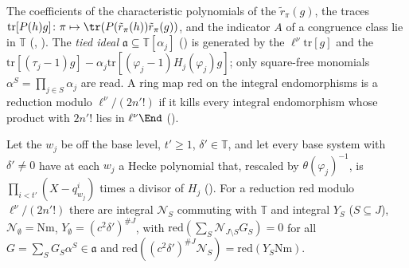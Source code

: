 The coefficients of the characteristic polynomials of the $\tilde r_\pi(g)$, the traces
$\mathrm{tr}[P(h)g]\colon\pi\mapsto\tr(P(\tilde r_\pi(h))\tilde r_\pi(g))$, and the indicator $A$ of a congruence class lie in
$\mathbb T$ (,
). The \emph{tied ideal}
$\mathfrak a\subseteq\mathbb T[\alpha_j]$ () is generated by the
$\ell^\nu\mathrm{tr}[g]$ and the $\mathrm{tr}[(\tau_j-1)g]-\alpha_j\mathrm{tr}[(\varphi_j-1)H_j(\varphi_j)g]$;
only square-free monomials $\alpha^S=\prod_{j\in S}\alpha_j$ are read. A ring map $\mathrm{red}$ on the integral
endomorphisms is a reduction modulo $\ell^\nu/(2n'!)$ if it kills every integral endomorphism whose
product with $2n'!$ lies in $\ell^\nu\End$ ().

\begin{theorem}\label{cg-first:thm:tie}
Let the $w_j$ be off the base level, $t'\ge1$, $\delta'\in\mathbb T$, and let every base system with
$\delta'\neq0$ have at each $w_j$ a Hecke polynomial that, rescaled by $\theta(\varphi_j)^{-1}$, is
$\prod_{i<t'}(X-q_{w_j}^i)$ times a divisor of $H_j$ (). For a reduction
$\mathrm{red}$ modulo $\ell^\nu/(2n'!)$ there are integral $\mathcal N_S$ commuting with $\mathbb T$ and
integral $Y_S$ ($S\subseteq J$), $\mathcal N_\emptyset=\mathrm{Nm}$, $Y_\emptyset=(c^2\delta')^{\#J}$, with
$\mathrm{red}(\sum_S\mathcal N_{J\setminus S}G_S)=0$ for all $G=\sum_SG_S\alpha^S\in\mathfrak a$ and
$\mathrm{red}((c^2\delta')^{\#J}\mathcal N_S)=\mathrm{red}(Y_S\mathrm{Nm})$.
\end{theorem}

